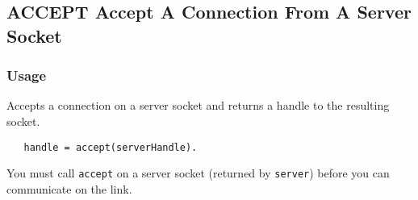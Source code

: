 %
%
%
\subsection{ACCEPT Accept A Connection From A Server Socket}
\subsubsection{Usage}
Accepts a connection on a server socket and returns a handle to the 
resulting socket.
\begin{verbatim}
   handle = accept(serverHandle).
\end{verbatim}
You must call \verb|accept| on a server socket (returned by \verb|server|) before you can communicate on the link.
